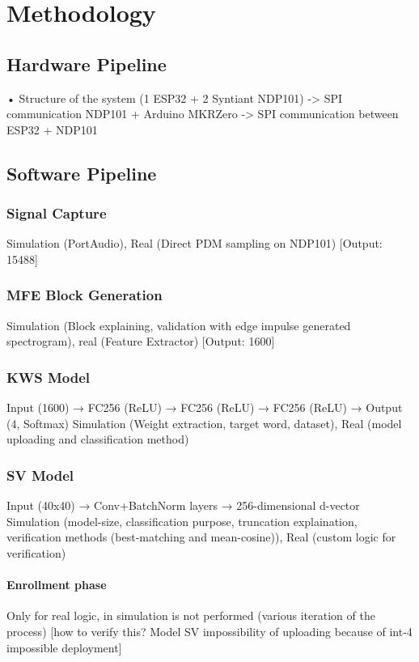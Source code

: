 \chapter{Methodology}
\label{cha:methodology}

\section{Hardware Pipeline}
\label{sec:hw pipeline}
• Structure of the system (1 ESP32 + 2 Syntiant NDP101)\newline
-> SPI communication NDP101 + Arduino MKRZero\newline
-> SPI communication between ESP32 + NDP101\newline\newline

\section{Software Pipeline}
\label{sec:sw pipeline}

\subsection{Signal Capture}
\label{subsec:signal}
Simulation (PortAudio), Real (Direct PDM sampling on NDP101) [Output: 15488]\newline
\subsection{MFE Block Generation}
\label{subsec:mfe}
Simulation (Block explaining, validation with edge impulse generated spectrogram), real (Feature Extractor) [Output: 1600]\newline
\subsection{KWS Model}
\label{subsec:kws model}
Input (1600) → FC256 (ReLU) → FC256 (ReLU) → FC256 (ReLU) → Output (4, Softmax)\newline
Simulation (Weight extraction, target word, dataset), Real (model uploading and classification method)\newline
\subsection{SV Model} 
\label{subsec:signal}
Input (40x40) → Conv+BatchNorm layers → 256-dimensional d-vector \newline
Simulation (model-size, classification purpose, truncation explaination, verification methods (best-matching and mean-cosine)), Real (custom logic for verification)\newline
\subsubsection{Enrollment phase}
\label{subsec:enrollment} 
Only for real logic, in simulation is not performed (various iteration of the process) [how to verify this? Model SV impossibility of uploading because of int-4 impossible deployment]\newline

\newpage